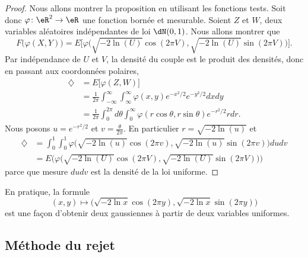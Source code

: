 \begin{proof}
    Nous allons montrer la proposition en utilisant les fonctions tests. Soit donc \( \varphi\colon \eR^2\to \eR\) une fonction bornée et mesurable. Soient \( Z\) et \( W\), deux variables aléatoires indépendantes de loi \( \dN(0,1)\). Nous allons montrer que
    \begin{equation}
        F\big( \varphi(X,Y) \big)=E\Big[ \varphi\big( \sqrt{-2\ln(U)}\cos(2\pi V),\sqrt{-2\ln(U)}\sin(2\pi V) \big) \Big].
    \end{equation}
    Par indépendance de \( U\) et \( V\), la densité du couple est le produit des densités, donc en passant aux coordonnées polaires,
    \begin{subequations}
        \begin{align}
            \diamondsuit&=E\big[ \varphi(Z,W) \big]\\
            &=\frac{1}{ 2\pi }\int_{-\infty}^{\infty}\int_{\infty}^{\infty}\varphi(x,y) e^{-x^2/2} e^{-y^2/2}dxdy\\
            &=\frac{1}{ 2\pi }\int_0^{2\pi}d\theta\int_0^{\infty}\varphi(r\cos\theta,r\sin\theta) e^{-r^2/2}rdr.
        \end{align}
    \end{subequations}
    Nous posons \( u= e^{-r^2/2}\) et \( v=\frac{ \theta }{ 2\pi }\). En particulier \( r=\sqrt{-2\ln(u)}\) et
    \begin{subequations}
        \begin{align}
            \diamondsuit&=\int_0^1\int_0^1\varphi\big( \sqrt{-2\ln(u)}\cos(2\pi v),\sqrt{-2\ln(u)}\sin(2\pi v) \big)dudv\\
            &=E\Big( \varphi\big( \sqrt{-2\ln(U)}\cos(2\pi V),\sqrt{-2\ln(U)}\sin(2\pi V) \big) \Big)
        \end{align}
    \end{subequations}
    parce que mesure \( dudv\) est la densité de la loi uniforme.
\end{proof}

En pratique, la formule 
\begin{equation}
    (x,y)\mapsto\big( \sqrt{-2\ln x}\cos(2\pi y),\sqrt{-2\ln x}\sin(2\pi y) \big)
\end{equation}
est une façon d'obtenir deux gaussiennes à partir de deux variables uniformes.

\subsection{Méthode du rejet}

